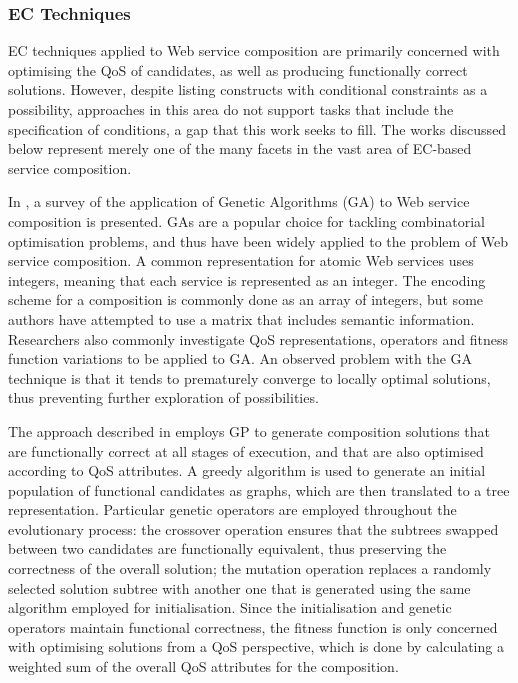 \documentclass[conference]{IEEEtran}
\begin{document}
\subsubsection{EC Techniques}
EC techniques applied to Web service composition are primarily concerned with optimising the QoS of candidates, as well as producing functionally correct solutions. However, despite listing constructs with conditional constraints as a possibility, approaches in this area do not support tasks that include the specification of conditions, a gap that this work seeks to fill. The works discussed below represent merely one of the many facets in the vast area of EC-based service composition.

In \cite{wang2012survey}, a survey of the application of Genetic Algorithms (GA) to Web service composition is presented.
GAs are a popular choice for tackling combinatorial optimisation problems, and thus have been widely
applied to the problem of Web service composition. A common representation for atomic Web services uses integers,
meaning that each service is represented as an integer. The encoding scheme for a composition is commonly done 
as an array of integers, but some authors have attempted to use a matrix that includes semantic information. Researchers
also commonly investigate QoS representations, operators and fitness function variations to be applied to GA. An observed
problem with the GA technique is that it tends to prematurely converge to locally optimal solutions, thus preventing further 
exploration of possibilities.

The approach described in \cite{wang2013genetic} employs GP to generate composition solutions that are functionally correct at all stages of execution, and that are also optimised according to QoS attributes. A greedy algorithm is used to generate an initial population of functional candidates as graphs, which are then translated to a tree representation. Particular genetic operators are employed throughout the evolutionary process: the crossover operation ensures that the subtrees swapped between two candidates are functionally equivalent, thus preserving the correctness of the overall solution; the mutation operation replaces a randomly selected solution subtree with another one that is generated using the same algorithm employed for initialisation. Since the initialisation and genetic operators maintain functional correctness, the fitness function is only concerned with optimising solutions from a QoS perspective, which is done by calculating a weighted sum of the overall QoS attributes for the composition.
\end{document}

